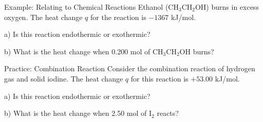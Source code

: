 \documentclass[11pt]{beamer}
\begin{document}
\begin{frame}{Example: Relating to Chemical Reactions}
  Ethanol (CH$_3$CH$_2$OH) burns in excess oxygen. The heat change $q$
  for the reaction is $-1367$ kJ/mol.

  a) Is this reaction endothermic or exothermic?

  b) What is the heat change when 0.200 mol of CH$_3$CH$_2$OH burns?


\end{frame}

\begin{frame}{Practice: Combination Reaction}
  Consider the combination reaction of hydrogen gas and solid
  iodine. The heat change $q$ for this reaction is $+53.00$ kJ/mol.

  a) Is this reaction endothermic or exothermic?

  b) What is the heat change when 2.50 mol of I$_2$ reacts?

  \vfill
\end{frame}
\end{document}
